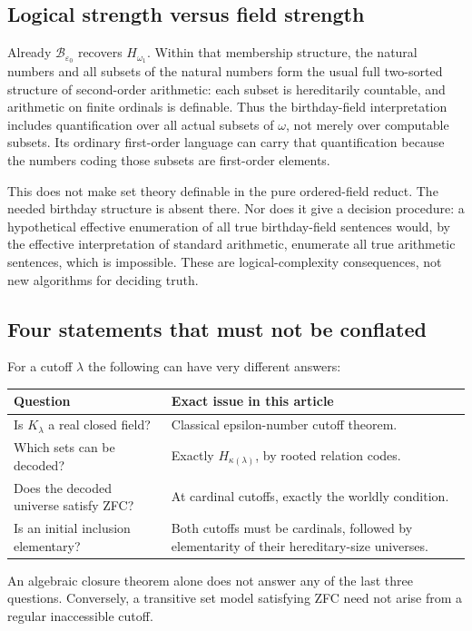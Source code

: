 \documentclass[11pt,letterpaper]{article}
\theoremstyle{definition}
\theoremstyle{remark}
\newcommand{\B}{\mathcal B}
\begin{document}
\subsection{Logical strength versus field strength}

Already $\B_{\varepsilon_0}$ recovers $H_{\omega_1}$. Within that membership
structure, the natural numbers and all subsets of the natural numbers form
the usual full two-sorted structure of second-order arithmetic: each subset
is hereditarily countable, and arithmetic on finite ordinals is definable.
Thus the birthday-field interpretation includes quantification over all
actual subsets of $\omega$, not merely over computable subsets. Its ordinary
first-order language can carry that quantification because the numbers
coding those subsets are first-order elements.

This does not make set theory definable in the pure ordered-field reduct.
The needed birthday structure is absent there. Nor does it give a decision
procedure: a hypothetical effective enumeration of all true birthday-field
sentences would, by the effective interpretation of standard arithmetic,
enumerate all true arithmetic sentences, which is impossible. These are
logical-complexity consequences, not new algorithms for deciding truth.

\subsection{Four statements that must not be conflated}

For a cutoff $\lambda$ the following can have very different answers:
\begin{center}
\begin{tabular}{@{}P{0.31\textwidth}P{0.61\textwidth}@{}}
\toprule
Question & Exact issue in this article\\
\midrule
Is $K_\lambda$ a real closed field? & Classical epsilon-number cutoff theorem.\\[0.35em]
Which sets can be decoded? & Exactly $H_{\kappa(\lambda)}$, by rooted relation codes.\\[0.35em]
Does the decoded universe satisfy ZFC? & At cardinal cutoffs, exactly the worldly condition.\\[0.35em]
Is an initial inclusion elementary? & Both cutoffs must be cardinals, followed by elementarity of their hereditary-size universes.\\
\bottomrule
\end{tabular}
\end{center}
An algebraic closure theorem alone does not answer any of the last three
questions. Conversely, a transitive set model satisfying ZFC need not arise
from a regular inaccessible cutoff.
\end{document}
